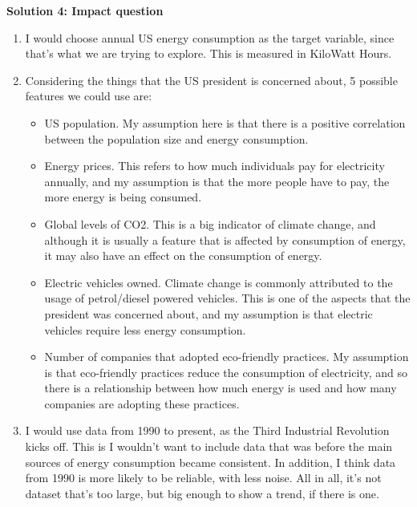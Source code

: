 \documentclass[submit]{harvardml}
\begin{document}
\newpage

\textbf{Solution 4: Impact question}

\begin{enumerate}
\item 
    I would choose annual US energy consumption as the target variable, since that's what we are trying to explore. This is measured in KiloWatt Hours.

\item
    Considering the things that the US president is concerned about, 5 possible features we could use are: 
    \begin{itemize}
        \item 
        US population. My assumption here is that there is a positive correlation between the population size and energy consumption.

        \item
        Energy prices. This refers to how much individuals pay for electricity annually, and my assumption is that the more people have to pay, the more energy is being consumed.

        \item
        Global levels of CO2. This is a big indicator of climate change, and although it is usually a feature that is affected by consumption of energy, it may also have an effect on the consumption of energy.

        \item
        Electric vehicles owned. Climate change is commonly attributed to the usage of petrol/diesel powered vehicles. This is one of the aspects that the president was concerned about, and my assumption is that electric vehicles require less energy consumption. 

        \item
        Number of companies that adopted eco-friendly practices. My assumption is that eco-friendly practices reduce the consumption of electricity, and so there is a relationship between how much energy is used and how many companies are adopting these practices. 
        
    \end{itemize}

\item
    I would use data from 1990 to present, as the Third Industrial Revolution kicks off. This is I wouldn't want to include data that was before the main sources of energy consumption became consistent. In addition, I think data from 1990 is more likely to be reliable, with less noise. All in all, it's not dataset that's too large, but big enough to show a trend, if there is one.


\end{enumerate}
\end{document}

